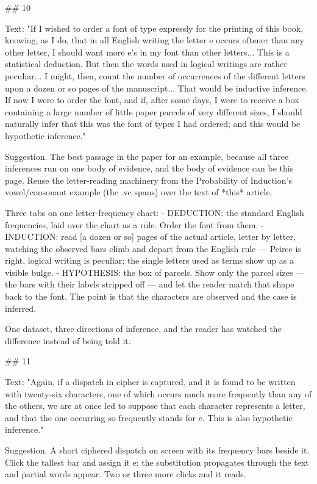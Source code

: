 ## 10

Text: "If I wished to order a font of type expressly for the printing of this
book, knowing, as I do, that in all English writing the letter e occurs oftener
than any other letter, I should want more e's in my font than other letters...
This is a statistical deduction. But then the words used in logical writings are
rather peculiar... I might, then, count the number of occurrences of the
different letters upon a dozen or so pages of the manuscript... That would be
inductive inference. If now I were to order the font, and if, after some days, I
were to receive a box containing a large number of little paper parcels of very
different sizes, I should naturally infer that this was the font of types I had
ordered; and this would be hypothetic inference."

Suggestion. The best passage in the paper for an example, because all three
inferences run on one body of evidence, and the body of evidence can be this
page. Reuse the letter-reading machinery from the Probability of Induction's
vowel/consonant example (the .vc spans) over the text of *this* article.

Three tabs on one letter-frequency chart:
 - DEDUCTION: the standard English frequencies, laid over the chart as a rule.
   Order the font from them.
 - INDUCTION: read [a dozen or so] pages of the actual article, letter by
   letter, watching the observed bars climb and depart from the English rule —
   Peirce is right, logical writing is peculiar; the single letters used as
   terms show up as a visible bulge.
 - HYPOTHESIS: the box of parcels. Show only the parcel sizes — the bars with
   their labels stripped off — and let the reader match that shape back to the
   font. The point is that the characters are observed and the case is inferred.

One dataset, three directions of inference, and the reader has watched the
difference instead of being told it.


## 11

Text: "Again, if a dispatch in cipher is captured, and it is found to be written
with twenty-six characters, one of which occurs much more frequently than any of
the others, we are at once led to suppose that each character represents a
letter, and that the one occurring so frequently stands for e. This is also
hypothetic inference."

Suggestion. A short ciphered dispatch on screen with its frequency bars beside
it. Click the tallest bar and assign it e; the substitution propagates through
the text and partial words appear. Two or three more clicks and it reads.

